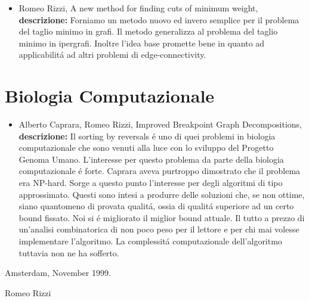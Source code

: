 \documentclass[10pt]{article}
\begin{document}
\begin{itemize}
  \vspace{1.4mm}
  \item[] {\sc Romeo Rizzi},
   \newblock  A new method for finding cuts of minimum weight,
   \\
{\bf descrizione:}
Forniamo un metodo nuovo
ed invero semplice per il problema del taglio minimo
in grafi.
Il metodo generalizza al problema del taglio minimo in ipergrafi.
Inoltre l'idea base promette bene
in quanto ad applicabilit\'a ad altri problemi di edge-connectivity.
\end{itemize}



\section{Biologia Computazionale}

\begin{itemize}
  \vspace{1.4mm}
  \item[] {\sc Alberto Caprara, Romeo Rizzi},
   \newblock  Improved Breakpoint Graph Decompositions,
   \\
{\bf descrizione:}
Il sorting by reversals \'e uno di quei
problemi in biologia computazionale
che sono venuti alla
luce con lo sviluppo del Progetto Genoma Umano.
L'interesse per questo problema da parte
della biologia computazionale \'e forte.
Caprara aveva purtroppo dimostrato che il problema
era NP-hard.
Sorge a questo punto l'interesse per degli algoritmi
di tipo approssimato.
Questi sono intesi a produrre delle soluzioni che, se non ottime,
siano quantomeno di provata qualit\'a,
ossia di qualit\'a superiore ad un certo bound fissato.
Noi si \'e migliorato il miglior
bound attuale.
Il tutto a prezzo di un'analisi combinatorica
di non poco peso per il lettore e per chi mai
volesse implementare l'algoritmo.
La complessit\'a computazionale dell'algoritmo
tuttavia non ne ha sofferto.\\
\end{itemize}



\vspace{1.6cm}
Amsterdam,
November 1999.\\
\vspace{2mm}

Romeo Rizzi
\end{document}
